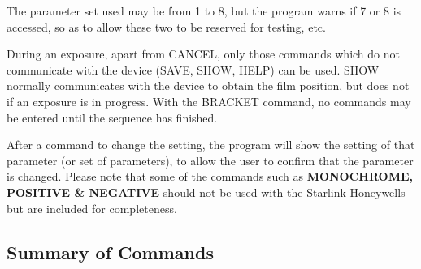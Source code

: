 The parameter set used may be from 1 to 8, but the program warns if
7 or 8 is accessed, so as to allow these two to be reserved for testing,
etc.

During an exposure, apart from CANCEL, only those commands which do not
communicate with the device (SAVE, SHOW, HELP) can be used. SHOW normally
communicates with the device to obtain the film position, but does not
if an exposure is in progress. With the BRACKET command, no commands may
be entered until the sequence has finished.

After a command to change the setting, the program will show the setting
of that parameter (or set of parameters), to allow the user to confirm
that the parameter is changed. Please note that some of the commands
such as {\bf MONOCHROME, POSITIVE \& NEGATIVE} should not be used with the 
Starlink Honeywells but are included for completeness.

\subsection{Summary of Commands}

